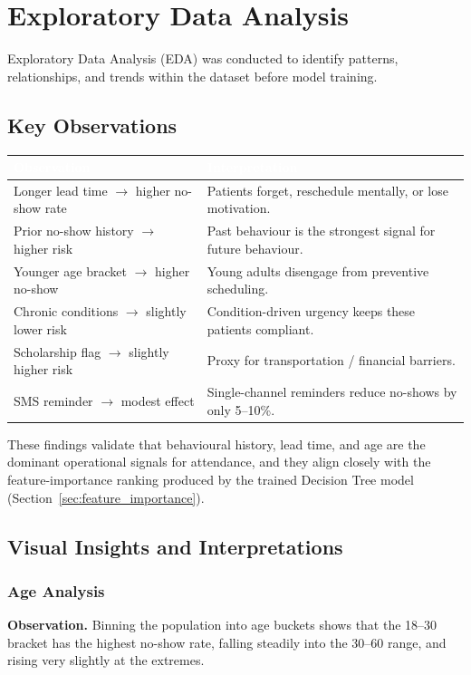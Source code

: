 \documentclass[11pt,a4paper]{article}
\newcommand{\hdrrow}[1]{\textcolor{white}{\textbf{#1}}}
\newcommand{\hdrline}{\rowcolor{navy}}
\begin{document}
\section{Exploratory Data Analysis}

Exploratory Data Analysis (EDA) was conducted to identify patterns,
relationships, and trends within the dataset before model training.

\subsection{Key Observations}

\begin{tabularx}{\textwidth}{|>{\hsize=0.45\hsize}X|X|}
\hline
\hdrline \hdrrow{Observation} & \hdrrow{Interpretation} \\ \hline
Longer lead time $\to$ higher no-show rate   & Patients forget, reschedule mentally, or lose motivation. \\ \hline
Prior no-show history $\to$ higher risk      & Past behaviour is the strongest signal for future behaviour. \\ \hline
Younger age bracket $\to$ higher no-show     & Young adults disengage from preventive scheduling. \\ \hline
Chronic conditions $\to$ slightly lower risk & Condition-driven urgency keeps these patients compliant. \\ \hline
Scholarship flag $\to$ slightly higher risk  & Proxy for transportation / financial barriers. \\ \hline
SMS reminder $\to$ modest effect             & Single-channel reminders reduce no-shows by only 5--10\%. \\ \hline
\end{tabularx}

These findings validate that behavioural history, lead time, and age are
the dominant operational signals for attendance, and they align closely
with the feature-importance ranking produced by the trained Decision Tree
model (Section~\ref{sec:feature_importance}).

\subsection{Visual Insights and Interpretations}

\subsubsection{Age Analysis}
\textbf{Observation.} Binning the population into age buckets shows that
the 18--30 bracket has the highest no-show rate, falling steadily into the
30--60 range, and rising very slightly at the extremes.
\end{document}
